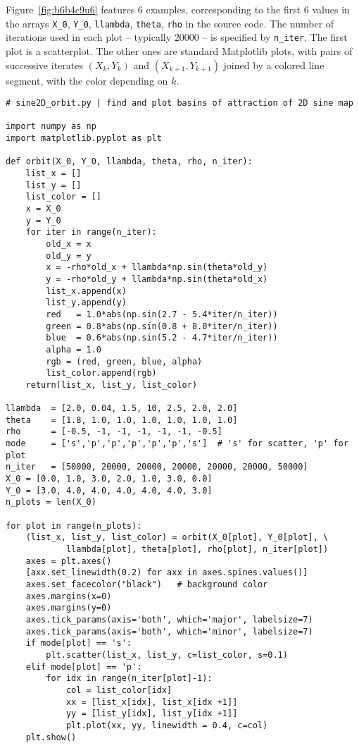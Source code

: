\documentclass[oneside,10pt]{book}
\begin{document}
Figure~\ref{fig:b6b4c9u6} features 6 examples, corresponding to the first 6 values
 in the arrays \texttt{X\_0}, \texttt{Y\_0}, \texttt{llambda}, \texttt{theta}, \texttt{rho} in the source code. The number of iterations used
 in each plot -- typically $\num{20000}$ -- is specified
 by \texttt{n\_iter}. The first plot is a scatterplot. The other ones are standard Matplotlib plots, with
 pairs of successive iterates $(X_k,Y_k)$ and $(X_{k+1},Y_{k+1})$ joined by a colored line segment, with the color depending on $k$.


\begin{lstlisting}
# sine2D_orbit.py | find and plot basins of attraction of 2D sine map

import numpy as np
import matplotlib.pyplot as plt

def orbit(X_0, Y_0, llambda, theta, rho, n_iter):
    list_x = []
    list_y = []
    list_color = []
    x = X_0
    y = Y_0
    for iter in range(n_iter):
        old_x = x
        old_y = y
        x = -rho*old_x + llambda*np.sin(theta*old_y)
        y = -rho*old_y + llambda*np.sin(theta*old_x)
        list_x.append(x)
        list_y.append(y)
        red   = 1.0*abs(np.sin(2.7 - 5.4*iter/n_iter))
        green = 0.8*abs(np.sin(0.8 + 8.0*iter/n_iter))
        blue  = 0.6*abs(np.sin(5.2 - 4.7*iter/n_iter))
        alpha = 1.0
        rgb = (red, green, blue, alpha)
        list_color.append(rgb)
    return(list_x, list_y, list_color)

llambda  = [2.0, 0.04, 1.5, 10, 2.5, 2.0, 2.0]
theta    = [1.8, 1.0, 1.0, 1.0, 1.0, 1.0, 1.0]
rho      = [-0.5, -1, -1, -1, -1, -1, -0.5]
mode     = ['s','p','p','p','p','p','s']  # 's' for scatter, 'p' for plot
n_iter   = [50000, 20000, 20000, 20000, 20000, 20000, 50000]
X_0 = [0.0, 1.0, 3.0, 2.0, 1.0, 3.0, 0.0]
Y_0 = [3.0, 4.0, 4.0, 4.0, 4.0, 4.0, 3.0]
n_plots = len(X_0)

for plot in range(n_plots):
    (list_x, list_y, list_color) = orbit(X_0[plot], Y_0[plot], \
            llambda[plot], theta[plot], rho[plot], n_iter[plot])
    axes = plt.axes()
    [axx.set_linewidth(0.2) for axx in axes.spines.values()]
    axes.set_facecolor("black")   # background color
    axes.margins(x=0)
    axes.margins(y=0)
    axes.tick_params(axis='both', which='major', labelsize=7)
    axes.tick_params(axis='both', which='minor', labelsize=7)
    if mode[plot] == 's':
        plt.scatter(list_x, list_y, c=list_color, s=0.1)
    elif mode[plot] == 'p':
        for idx in range(n_iter[plot]-1):
            col = list_color[idx]
            xx = [list_x[idx], list_x[idx +1]]
            yy = [list_y[idx], list_y[idx +1]]
            plt.plot(xx, yy, linewidth = 0.4, c=col)
    plt.show()
\end{lstlisting}
\end{document}
